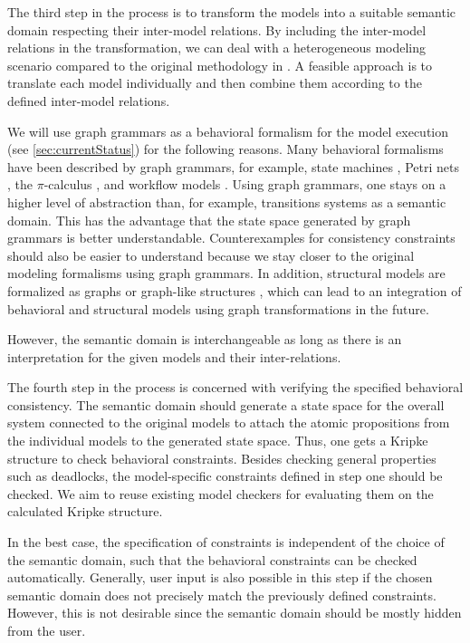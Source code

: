 \documentclass[conference]{IEEEtran}
\begin{document}
The third step in the process is to transform the models into a suitable semantic domain respecting their inter-model relations.
By including the inter-model relations in the transformation, we can deal with a heterogeneous modeling scenario compared to the original methodology in \cite{engelsMethodologySpecifyingAnalyzing2001}.
A feasible approach is to translate each model individually and then combine them according to the defined inter-model relations.

We will use graph grammars as a behavioral formalism for the model execution (see \autoref{sec:currentStatus}) for the following reasons.
Many behavioral formalisms have been described by graph grammars, for example, state machines \cite{kuskeFormalSemanticsUML2001, varroFormalSemanticsUML2002}, Petri nets \cite{ehrigGraphGrammarsPetri2004}, the $\pi$-calculus \cite{gadducciGraphRewritingPcalculus2007}, and workflow models \cite{rutleMetamodellingApproachBehavioural2012}.
Using graph grammars, one stays on a higher level of abstraction than, for example, transitions systems as a semantic domain.
This has the advantage that the state space generated by graph grammars is better understandable.
Counterexamples for consistency constraints should also be easier to understand because we stay closer to the original modeling formalisms using graph grammars.
In addition, structural models are formalized as graphs or graph-like structures \cite{stunkelMultipleModelSynchronization2020}, which can lead to an integration of behavioral and structural models using graph transformations in the future. 

However, the semantic domain is interchangeable as long as there is an interpretation for the given models and their inter-relations.

The fourth step in the process is concerned with verifying the specified behavioral consistency.
The semantic domain should generate a state space for the overall system connected to the original models to attach the atomic propositions from the individual models to the generated state space.
Thus, one gets a Kripke structure to check behavioral constraints.
Besides checking general properties such as deadlocks, the model-specific constraints defined in step one should be checked.
We aim to reuse existing model checkers for evaluating them on the calculated Kripke structure.

In the best case, the specification of constraints is independent of the choice of the semantic domain, such that the behavioral constraints can be checked automatically.
Generally, user input is also possible in this step if the chosen semantic domain does not precisely match the previously defined constraints.
However, this is not desirable since the semantic domain should be mostly hidden from the user.
\end{document}
